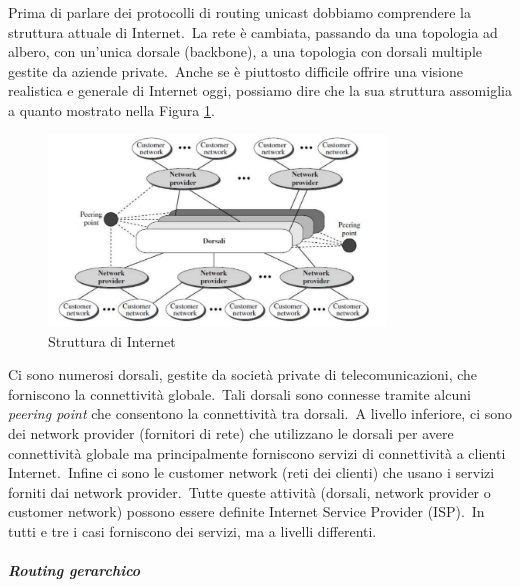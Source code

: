 Prima di parlare dei protocolli di routing unicast dobbiamo comprendere la struttura attuale di Internet.\
La rete è cambiata, passando da una topologia ad albero, con un'unica dorsale (backbone), a una topologia con dorsali multiple gestite da aziende private.\
Anche se è piuttosto difficile offrire una visione realistica e generale di Internet oggi, possiamo dire che la sua struttura assomiglia a quanto mostrato nella Figura \ref{Struttura}.

\begin{figure}[H]
    \centering
    \includegraphics[width=0.8\textwidth]{immagini/Struttura_Internet.jpg}
    \caption{Struttura di Internet}
    \label{Struttura}
\end{figure}
Ci sono numerosi dorsali, gestite da società private di telecomunicazioni, che forniscono la connettività globale.\
Tali dorsali sono connesse tramite alcuni \emph{peering point} che consentono la connettività tra dorsali.\
A livello inferiore, ci sono dei network provider (fornitori di rete) che utilizzano le dorsali per avere connettività globale ma principalmente forniscono servizi di connettività a clienti Internet.\
Infine ci sono le customer network (reti dei clienti) che usano i servizi forniti dai network provider.\
Tutte queste attività (dorsali, network provider o customer network) possono essere definite Internet Service Provider (ISP).\
In tutti e tre i casi forniscono dei servizi, ma a livelli differenti.

\paragraph{\emph{Routing gerarchico}}

